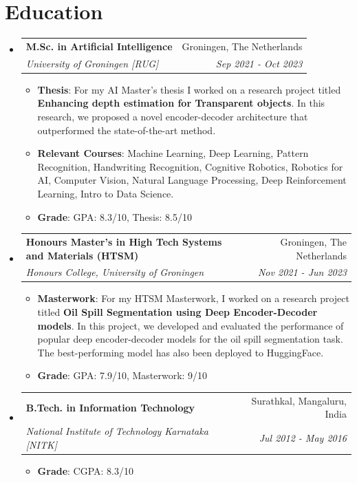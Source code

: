 \documentclass[letterpaper, 10pt]{article}
\makeatletter
\newcommand{\resumeItem}[2]{
    \item\small{
        \textbf{#1}{: #2 \vspace{-2pt}}
    }
}
\newcommand{\resumeSubheading}[4]{
    \vspace{-1pt}\item
    \begin{tabular*}{0.97\textwidth}{l@{\extracolsep{\fill}}r}
        \textbf{#1} & #2 \\
        \textit{\small#3} & \textit{\small #4} \\
    \end{tabular*}\vspace{-5pt}
}
\newcommand{\resumeSubHeadingListStart}{\begin{itemize}[leftmargin=*]}
\newcommand{\resumeSubHeadingListEnd}{\end{itemize}\vspace{-5pt}}
\makeatother
\begin{document}
\section{Education}
    \resumeSubHeadingListStart
        \resumeSubheading
            {M.Sc. in Artificial Intelligence}{Groningen, The Netherlands}
            {University of Groningen [RUG]}{Sep 2021 - Oct 2023}
            \resumeSubHeadingListStart
                \resumeItem{Thesis}{For my AI Master's thesis I worked on a research project titled \textbf{Enhancing depth estimation for Transparent objects}. In this research, we proposed a novel encoder-decoder architecture that outperformed the state-of-the-art method.}
                \resumeItem{Relevant Courses}{Machine Learning, Deep Learning, Pattern Recognition, Handwriting Recognition, Cognitive Robotics, Robotics for AI, Computer Vision, Natural Language Processing, Deep Reinforcement Learning, Intro to Data Science.}
                \resumeItem{Grade}{GPA: 8.3/10, Thesis: 8.5/10}
            \resumeSubHeadingListEnd

        \resumeSubheading
            {Honours Master's in High Tech Systems and Materials (HTSM)}{Groningen, The Netherlands}
            {Honours College, University of Groningen}{Nov 2021 - Jun 2023}
            \resumeSubHeadingListStart
                \resumeItem{Masterwork}{For my HTSM Masterwork, I worked on a research project titled \textbf{Oil Spill Segmentation using Deep Encoder-Decoder models}. In this project, we developed and evaluated the performance of popular deep encoder-decoder models for the oil spill segmentation task. The best-performing model has also been deployed to HuggingFace.}
                \resumeItem{Grade}{GPA: 7.9/10, Masterwork: 9/10}
            \resumeSubHeadingListEnd
        
        \resumeSubheading
            {B.Tech. in Information Technology}{Surathkal, Mangaluru,  India}
            {National Institute of Technology Karnataka [NITK]}{Jul 2012 - May 2016}
            \resumeSubHeadingListStart
                \resumeItem{Grade}{CGPA: 8.3/10}
            \resumeSubHeadingListEnd
    \resumeSubHeadingListEnd
\end{document}
